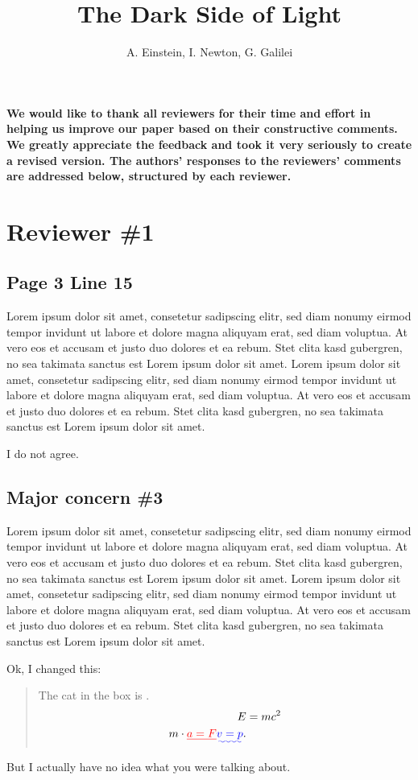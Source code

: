 \documentclass{ar2rc}
\title{The Dark Side of Light}
\author{A. Einstein, I. Newton, G. Galilei}
\begin{document}
\maketitle

\textbf{We would like to thank all reviewers for their time and effort in helping us improve our paper based on their constructive comments. We greatly appreciate the feedback and took it very seriously to create a revised version. The authors' responses to the reviewers' comments are addressed below, structured by each reviewer.}

\section{Reviewer \#1}

\subsection{Page 3 Line 15}

\RC Lorem ipsum dolor sit amet, consetetur sadipscing elitr, sed diam nonumy eirmod tempor invidunt ut labore et dolore magna aliquyam erat, sed diam voluptua. At vero eos et accusam et justo duo dolores et ea rebum. Stet clita kasd gubergren, no sea takimata sanctus est Lorem ipsum dolor sit amet. Lorem ipsum dolor sit amet, consetetur sadipscing elitr, sed diam nonumy eirmod tempor invidunt ut labore et dolore magna aliquyam erat, sed diam voluptua. At vero eos et accusam et justo duo dolores et ea rebum. Stet clita kasd gubergren, no sea takimata sanctus est Lorem ipsum dolor sit amet.

\AR I do not agree.

\subsection{Major concern \#3}

\RC Lorem ipsum dolor sit amet, consetetur sadipscing elitr, sed diam nonumy eirmod tempor invidunt ut labore et dolore magna aliquyam erat, sed diam voluptua. At vero eos et accusam et justo duo dolores et ea rebum. Stet clita kasd gubergren, no sea takimata sanctus est Lorem ipsum dolor sit amet. Lorem ipsum dolor sit amet, consetetur sadipscing elitr, sed diam nonumy eirmod tempor invidunt ut labore et dolore magna aliquyam erat, sed diam voluptua. At vero eos et accusam et justo duo dolores et ea rebum. Stet clita kasd gubergren, no sea takimata sanctus est Lorem ipsum dolor sit amet.

\AR Ok, I changed this:

\begin{quote}
	The cat in the box is \DIFdelbegin {}\DIFdelend \DIFaddbegin {}\DIFaddend .
	\begin{align}
		E &= mc^2 \\
		m\cdot \DIFdelbegin \DIFdel{a=F}\DIFdelend \DIFaddbegin \DIFadd{v=p}\DIFaddend .
	\end{align}
\end{quote}

But I actually have no idea what you were talking about.
\end{document}
